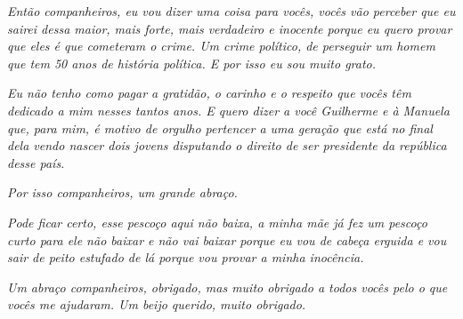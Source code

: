 \emph{Então companheiros, eu vou dizer uma coisa para vocês, vocês vão
perceber que eu sairei dessa maior, mais forte, mais verdadeiro e
inocente porque eu quero provar que eles é que cometeram o crime. Um
crime político, de perseguir um homem que tem 50 anos de história
política. E por isso eu sou muito grato.}

\emph{Eu não tenho como pagar a gratidão, o carinho e o respeito que
vocês têm dedicado a mim nesses tantos anos. E quero dizer a você
Guilherme e à Manuela que, para mim, é motivo de orgulho pertencer a uma
geração que está no final dela vendo nascer dois jovens disputando o
direito de ser presidente da república desse país.}

\emph{Por isso companheiros, um grande abraço.}

\emph{Pode ficar certo, esse pescoço aqui não baixa, a minha mãe já fez
um pescoço curto para ele não baixar e não vai baixar porque eu vou de
cabeça erguida e vou sair de peito estufado de lá porque vou provar a
minha inocência.}

\emph{Um abraço companheiros, obrigado, mas muito obrigado a todos vocês
pelo o que vocês me ajudaram. Um beijo querido, muito obrigado.~}
